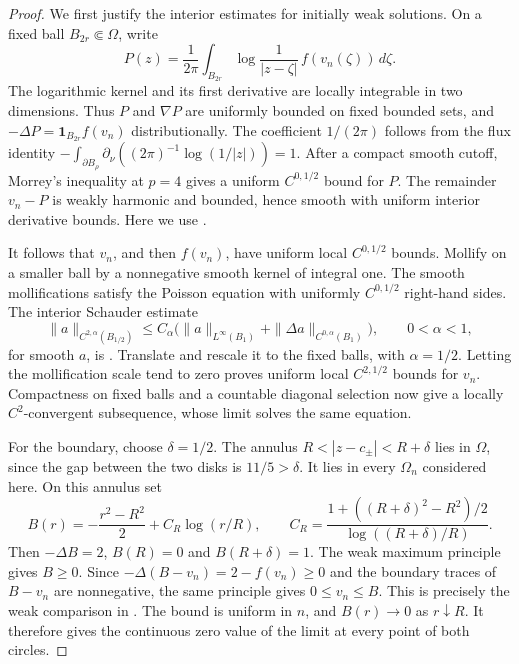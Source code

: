 \documentclass[11pt]{article}
\begin{document}
\begin{proof}
We first justify the interior estimates for initially weak solutions.
On a fixed ball \(B_{2r}\Subset\Omega\), write
\[
 P(z)=\frac1{2\pi}\int_{B_{2r}}
       \log\frac1{|z-\zeta|}\,f(v_n(\zeta))\,d\zeta.
\]
The logarithmic kernel and its first derivative are locally integrable
in two dimensions. Thus \(P\) and \(\nabla P\) are uniformly bounded
on fixed bounded sets, and
\(-\Delta P=\mathbf1_{B_{2r}}f(v_n)\) distributionally.
The coefficient \(1/(2\pi)\) follows from the flux identity
\(-\int_{\partial B_\rho}\partial_\nu((2\pi)^{-1}
\log(1/|z|))=1\).
After a compact smooth cutoff, Morrey's inequality at \(p=4\)
gives a uniform \(C^{0,1/2}\) bound for \(P\).
The remainder \(v_n-P\) is weakly harmonic and bounded, hence smooth
with uniform interior derivative bounds.
Here we use \cite[Theorem~1.5 and Corollary~1.12]{FRRO}.

It follows that \(v_n\), and then \(f(v_n)\), have uniform local
\(C^{0,1/2}\) bounds. Mollify on a smaller ball by a nonnegative
smooth kernel of integral one. The smooth mollifications satisfy the
Poisson equation with uniformly \(C^{0,1/2}\) right-hand sides.
The interior Schauder estimate
\[
 \|a\|_{C^{2,\alpha}(B_{1/2})}
 \le C_\alpha\bigl(\|a\|_{L^\infty(B_1)}
                    +\|\Delta a\|_{C^{0,\alpha}(B_1)}\bigr),
 \qquad 0<\alpha<1,
\]
for smooth \(a\), is \cite[Theorem~2.12]{FRRO}.
Translate and rescale it to the fixed balls, with \(\alpha=1/2\).
Letting the mollification scale tend to zero proves uniform local
\(C^{2,1/2}\) bounds for \(v_n\).
Compactness on fixed balls and a countable diagonal selection now give
a locally \(C^2\)-convergent subsequence, whose limit solves the
same equation.

For the boundary, choose \(\delta=1/2\). The annulus
\(R<|z-c_\pm|<R+\delta\) lies in \(\Omega\), since the gap between
the two disks is \(11/5>\delta\).
It lies in every \(\Omega_n\) considered here.
On this annulus set
\[
 B(r)=-\frac{r^2-R^2}{2}+C_R\log(r/R),\qquad
 C_R=\frac{1+((R+\delta)^2-R^2)/2}{\log((R+\delta)/R)}.
\]
Then \(-\Delta B=2\), \(B(R)=0\) and \(B(R+\delta)=1\).
The weak maximum principle gives \(B\ge0\).
Since
\(-\Delta(B-v_n)=2-f(v_n)\ge0\) and the boundary traces of
\(B-v_n\) are nonnegative, the same principle gives \(0\le v_n\le B\).
This is precisely the weak comparison in
\cite[Proposition~1.13]{FRRO}.
The bound is uniform in \(n\), and \(B(r)\to0\) as \(r\downarrow R\).
It therefore gives the continuous zero value of the limit at every
point of both circles.
\end{proof}
\end{document}
